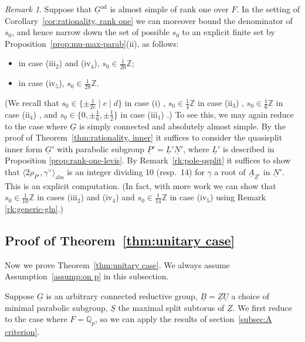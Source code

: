 \documentclass[a4paper]{amsart}
\numberwithin{equation}{section}
\theoremstyle{remark}
\newtheorem{remark}[thm]{Remark}
\theoremstyle{definition}
\DeclareMathOperator{\ad}{ad}
\newcommand{\Z}{\mathbb{Z}}
\newcommand{\Q}{\mathbb{Q}}
\newcommand{\alggrp}[1]{\underline{#1}}
\newcommand{\abs}{\mathrm{abs}}
\newcommand{\ang}[1]{\langle #1\rangle}
\begin{document}
\begin{remark}\label{rk:rank-1-poles}
  Suppose that $\alggrp{G}^{\ad}$ is almost simple of rank one over $F$.
  In the setting of Corollary~\ref{cor:rationality, rank one} we can moreover bound the denominator of $s_0$, and hence narrow down the set of possible $s_0$ to an explicit finite set by Proposition~\ref{prop:mu-max-parab}(ii), as follows:
  \begin{itemize}
  \item in case (iii$_2$) and (iv$_4$), $s_0 \in \frac 1{20}\Z$;
  \item in case (iv$_5$), $s_0 \in \frac 1{28}\Z$.
  \end{itemize}
  (We recall that $s_0 \in \{ \pm \frac 1{2e} \mid e \mid d \}$ in case (i) \cite{MR1040995}, $s_0 \in \frac 14 \Z$ in case (ii$_3$) \cite{MR734788}, $s_0 \in \frac 16 \Z$ in case (ii$_4$) \cite{Konno}, and $s_0 \in \{ 0, \pm \frac 16, \pm \frac 12 \}$ in case (iii$_1$) \cite{MR1749954}.)
  To see this, we may again reduce to the case where $\alggrp G$ is simply connected and absolutely almost simple.
  By the proof of Theorem~\ref{thm:rationality, inner} it suffices to consider the quasisplit inner form $\alggrp G'$ with parabolic subgroup $\alggrp P' = \alggrp L'\alggrp N'$, where $\alggrp L'$ is described in Proposition \ref{prop:rank-one-levis}.
  By Remark~\ref{rk:pole-qsplit} it suffices to show that $\ang{2\rho_{P'},\gamma^\vee}_{\abs}$ is an integer dividing 10 (resp.\ 14) for $\gamma$ a root of $\alggrp A_{\alggrp Z'}$ in $\alggrp N'$.
  This is an explicit computation.
  (In fact, with more work we can show that $s_0 \in \frac 1{10}\Z$ in cases (iii$_2$) and (iv$_4$) and $s_0 \in \frac 1{14}\Z$ in case (iv$_5$) using Remark \ref{rk:generic-gln}.)
\end{remark}

\subsection{Proof of Theorem~\ref{thm:unitary case}}
\label{subsec:proof of theorem for unitary}
Now we prove Theorem~\ref{thm:unitary case}.
We always assume Assumption~\ref{assump:on p} in this subsection.

Suppose $\alggrp{G}$ is an arbitrary connected reductive group, $\alggrp{B} = \alggrp{Z} \alggrp{U}$ a choice of minimal parabolic subgroup, $\alggrp{S}$ the maximal split subtorus of $\alggrp{Z}$.
We first reduce to the case where $F = \Q_p$, so we can apply the results of section~\ref{subsec:A criterion}.
\end{document}
